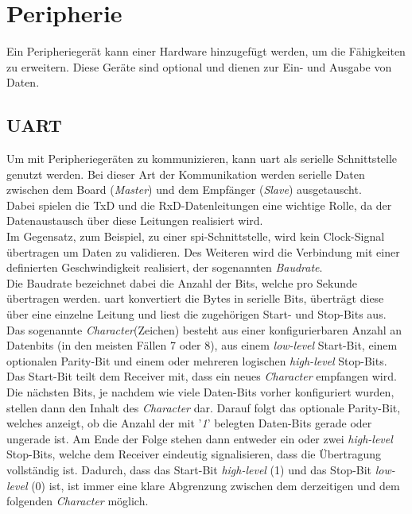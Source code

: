  \section{Peripherie}\label{kap:peripherie}
 Ein Peripheriegerät kann einer Hardware hinzugefügt werden, um die Fähigkeiten zu erweitern. Diese Geräte sind optional und dienen zur Ein- und Ausgabe von Daten.

\subsection{UART}\label{kap:uart}

Um mit Peripheriegeräten zu kommunizieren, kann \ac{uart} als serielle Schnittstelle genutzt werden.
Bei dieser Art der Kommunikation werden serielle Daten zwischen dem Board (\emph{Master})
und dem Empfänger (\emph{Slave}) ausgetauscht. \\
Dabei spielen die TxD und die RxD-Datenleitungen
eine wichtige Rolle, da der Datenaustausch über diese Leitungen realisiert wird.\\
Im Gegensatz, zum Beispiel, zu einer \ac{spi}-Schnittstelle, wird kein Clock-Signal
übertragen um Daten zu validieren. Des Weiteren wird die Verbindung mit einer definierten
Geschwindigkeit realisiert, der sogenannten \emph{Baudrate}. \cite{uartpdf} \\
Die Baudrate bezeichnet dabei die Anzahl der Bits, welche pro Sekunde übertragen werden.
\ac{uart} konvertiert die Bytes in serielle Bits, überträgt diese über eine einzelne Leitung
und liest die zugehörigen Start- und Stop-Bits aus.\\
Das sogenannte \emph{Character}(Zeichen) besteht aus einer konfigurierbaren Anzahl an Datenbits (in den meisten
Fällen 7 oder 8), aus einem \emph{low-level} Start-Bit, einem optionalen Parity-Bit und einem
oder mehreren logischen \emph{high-level} Stop-Bits.\\
Das Start-Bit teilt dem Receiver mit, dass ein neues \emph{Character} empfangen wird.
Die nächsten Bits, je nachdem wie viele Daten-Bits vorher konfiguriert wurden, stellen
dann den Inhalt des \emph{Character} dar. Darauf folgt das optionale Parity-Bit,
welches anzeigt, ob die Anzahl der mit '\emph{1}' belegten Daten-Bits gerade oder
ungerade ist. Am Ende der Folge stehen dann entweder ein oder zwei  \emph{high-level } Stop-Bits,
welche dem Receiver eindeutig signalisieren, dass die Übertragung vollständig ist. Dadurch,
dass das Start-Bit \emph{high-level} (1) und das Stop-Bit \emph{low-level} (0) ist,
ist immer eine klare Abgrenzung zwischen dem derzeitigen und dem folgenden \emph{Character} möglich.\\

